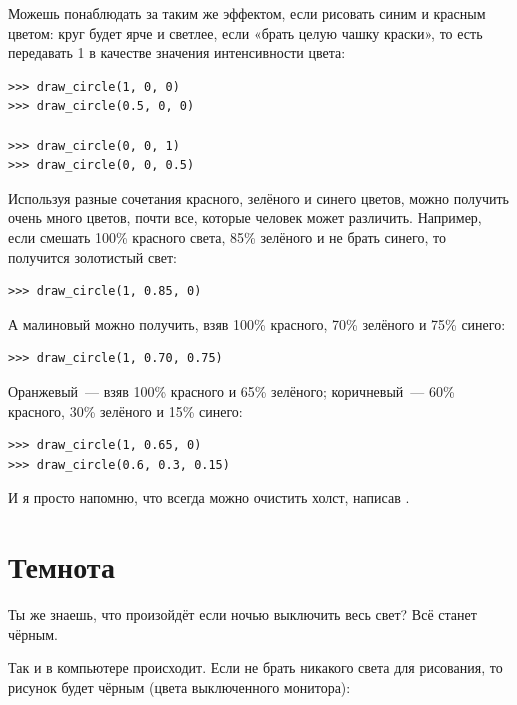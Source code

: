 Можешь понаблюдать за таким же эффектом, если рисовать синим и красным цветом: круг будет ярче и светлее, если «брать целую чашку краски», то есть передавать 1 в качестве значения интенсивности цвета:

\begin{listing}
\begin{verbatim}
>>> draw_circle(1, 0, 0)
>>> draw_circle(0.5, 0, 0)

>>> draw_circle(0, 0, 1)
>>> draw_circle(0, 0, 0.5)
\end{verbatim}
\end{listing}

Используя разные сочетания красного, зелёного и синего цветов, можно получить очень много цветов, почти все, которые человек может различить. Например, если смешать 100\% красного света, 85\% зелёного и не брать синего, то получится золотистый свет:
\begin{listing}
\begin{verbatim}
>>> draw_circle(1, 0.85, 0)
\end{verbatim}
\end{listing}

А малиновый можно получить, взяв 100\% красного, 70\% зелёного и 75\% синего:

\begin{listing}
\begin{verbatim}
>>> draw_circle(1, 0.70, 0.75)
\end{verbatim}
\end{listing}

Оранжевый — взяв 100\% красного и 65\% зелёного; коричневый — 60\% красного, 30\% зелёного и 15\% синего:

\begin{listing}
\begin{verbatim}
>>> draw_circle(1, 0.65, 0)
>>> draw_circle(0.6, 0.3, 0.15)
\end{verbatim}
\end{listing}

И я просто напомню, что всегда можно очистить холст, написав .

\section{Темнота}

Ты же знаешь, что произойдёт если ночью выключить весь свет? Всё станет чёрным.

Так и в компьютере происходит. Если не брать никакого света для рисования, то рисунок будет чёрным (цвета выключенного монитора):

